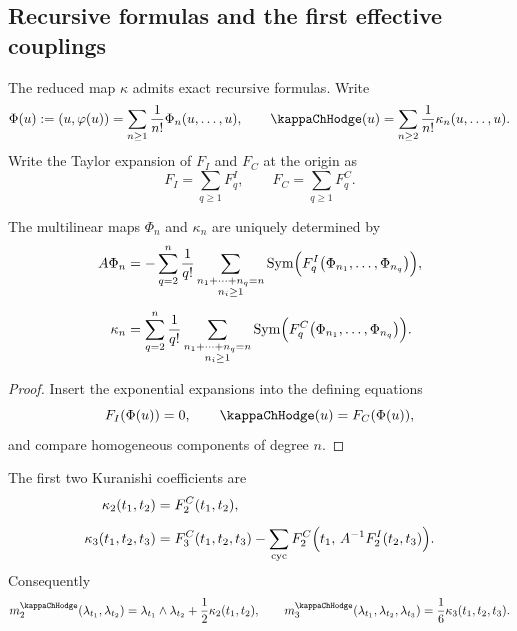 \subsection{Recursive formulas and the first effective couplings}

The reduced map $\kappa$ admits exact recursive formulas. Write
\[
\Phi(u):=(u,\varphi(u))=\sum_{n\ge 1}\frac{1}{n!}\Phi_n(u,\dots,u),
\qquad
\kappaChHodge(u)=\sum_{n\ge 2}\frac{1}{n!}\kappa_n(u,\dots,u).
\]
Write the Taylor expansion of $F_I$ and $F_C$ at the origin as
\[
F_I=\sum_{q\ge 1}F_q^I,
\qquad
F_C=\sum_{q\ge 1}F_q^C.
\]

\begin{proposition}%
The multilinear maps $\Phi_n$ and $\kappa_n$ are uniquely determined by
\begin{align}
A\Phi_n
&=
-
\sum_{q=2}^{n}
\frac{1}{q!}
\sum_{\substack{n_1+\cdots+n_q=n\\ n_i\ge 1}}
\operatorname{Sym}\Bigl(F_q^I\bigl(\Phi_{n_1},\dots,\Phi_{n_q}\bigr)\Bigr),
\\[0.5em]
\kappa_n
&=
\sum_{q=2}^{n}
\frac{1}{q!}
\sum_{\substack{n_1+\cdots+n_q=n\\ n_i\ge 1}}
\operatorname{Sym}\Bigl(F_q^C\bigl(\Phi_{n_1},\dots,\Phi_{n_q}\bigr)\Bigr).
\end{align}
\end{proposition}

\begin{proof}
Insert the exponential expansions into the defining equations
\[
F_I(\Phi(u))=0,
\qquad
\kappaChHodge(u)=F_C(\Phi(u)),
\]
and compare homogeneous components of degree $n$.
\end{proof}

\begin{corollary}%
The first two Kuranishi coefficients are
\begin{align}
\kappa_2(t_1,t_2)
&=
F_2^C(t_1,t_2),
\\[0.5em]
\kappa_3(t_1,t_2,t_3)
&=
F_3^C(t_1,t_2,t_3)
-
\sum_{\mathrm{cyc}}
F_2^C\Bigl(t_1,\,A^{-1}F_2^I(t_2,t_3)\Bigr).
\end{align}
Consequently
\[
m_2^\kappaChHodge(\lambda_{t_1},\lambda_{t_2})
=
\lambda_{t_1}\wedge \lambda_{t_2}
+\frac{1}{2}\kappa_2(t_1,t_2),
\qquad
m_3^\kappaChHodge(\lambda_{t_1},\lambda_{t_2},\lambda_{t_3})
=
\frac{1}{6}\kappa_3(t_1,t_2,t_3).
\]
\end{corollary}

